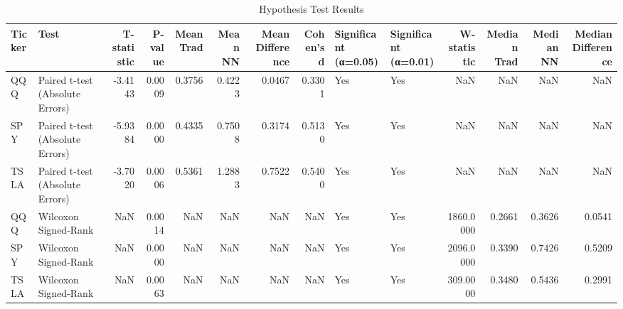 \begin{table}
\caption{Hypothesis Test Results}
\label{tab:hypothesis_tests}
\begin{tabular}{llrrrrrrllrrrr}
\toprule
Ticker & Test & T-statistic & P-value & Mean Trad & Mean NN & Mean Difference & Cohen's d & Significant (α=0.05) & Significant (α=0.01) & W-statistic & Median Trad & Median NN & Median Difference \\
\midrule
QQQ & Paired t-test (Absolute Errors) & -3.4143 & 0.0009 & 0.3756 & 0.4223 & 0.0467 & 0.3301 & Yes & Yes & NaN & NaN & NaN & NaN \\
SPY & Paired t-test (Absolute Errors) & -5.9384 & 0.0000 & 0.4335 & 0.7508 & 0.3174 & 0.5130 & Yes & Yes & NaN & NaN & NaN & NaN \\
TSLA & Paired t-test (Absolute Errors) & -3.7020 & 0.0006 & 0.5361 & 1.2883 & 0.7522 & 0.5400 & Yes & Yes & NaN & NaN & NaN & NaN \\
QQQ & Wilcoxon Signed-Rank & NaN & 0.0014 & NaN & NaN & NaN & NaN & Yes & Yes & 1860.0000 & 0.2661 & 0.3626 & 0.0541 \\
SPY & Wilcoxon Signed-Rank & NaN & 0.0000 & NaN & NaN & NaN & NaN & Yes & Yes & 2096.0000 & 0.3390 & 0.7426 & 0.5209 \\
TSLA & Wilcoxon Signed-Rank & NaN & 0.0063 & NaN & NaN & NaN & NaN & Yes & Yes & 309.0000 & 0.3480 & 0.5436 & 0.2991 \\
\bottomrule
\end{tabular}
\end{table}
